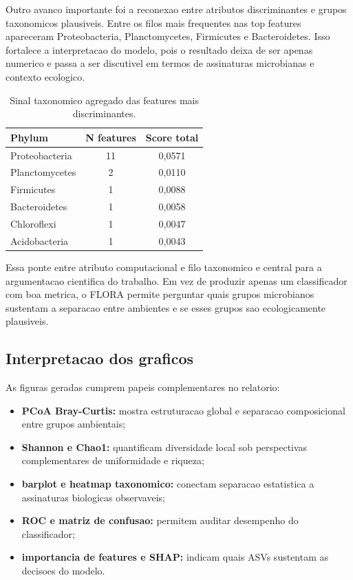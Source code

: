 \documentclass[12pt,a4paper]{article}
\begin{document}
Outro avanco importante foi a reconexao entre atributos discriminantes e grupos taxonomicos plausiveis. Entre os filos mais frequentes nas top features apareceram Proteobacteria, Planctomycetes, Firmicutes e Bacteroidetes. Isso fortalece a interpretacao do modelo, pois o resultado deixa de ser apenas numerico e passa a ser discutivel em termos de assinaturas microbianas e contexto ecologico.

\begin{table}[H]
    \centering
    \caption{Sinal taxonomico agregado das features mais discriminantes.}
    \label{tab:taxonomic_signal}
    \begin{tabular}{>{\raggedright\arraybackslash}p{4.5cm} c c}
        \toprule
        \textbf{Phylum} & \textbf{N features} & \textbf{Score total} \\
        \midrule
        Proteobacteria & 11 & 0,0571 \\
        Planctomycetes & 2 & 0,0110 \\
        Firmicutes & 1 & 0,0088 \\
        Bacteroidetes & 1 & 0,0058 \\
        Chloroflexi & 1 & 0,0047 \\
        Acidobacteria & 1 & 0,0043 \\
        \bottomrule
    \end{tabular}
\end{table}

Essa ponte entre atributo computacional e filo taxonomico e central para a argumentacao cientifica do trabalho. Em vez de produzir apenas um classificador com boa metrica, o FLORA permite perguntar quais grupos microbianos sustentam a separacao entre ambientes e se esses grupos sao ecologicamente plausiveis.

\subsection{Interpretacao dos graficos}

As figuras geradas cumprem papeis complementares no relatorio:

\begin{itemize}[leftmargin=1.5cm]
    \item \textbf{PCoA Bray-Curtis:} mostra estruturacao global e separacao composicional entre grupos ambientais;
    \item \textbf{Shannon e Chao1:} quantificam diversidade local sob perspectivas complementares de uniformidade e riqueza;
    \item \textbf{barplot e heatmap taxonomico:} conectam separacao estatistica a assinaturas biologicas observaveis;
    \item \textbf{ROC e matriz de confusao:} permitem auditar desempenho do classificador;
    \item \textbf{importancia de features e SHAP:} indicam quais ASVs sustentam as decisoes do modelo.
\end{itemize}
\end{document}
